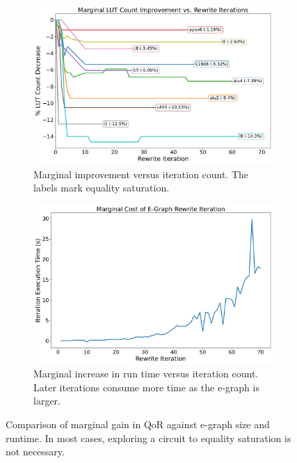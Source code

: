 \begin{figure}
    \begin{subfigure}{0.47\textwidth}
        \centering
        \includegraphics[width=\textwidth]{img/improvement.pdf}
        \caption{Marginal improvement versus iteration count. The labels mark equality saturation.}\label{fig:marginal:improvement}
    \end{subfigure}
    \hfill\vspace{4mm}
    \begin{subfigure}{0.47\textwidth}
        \centering
        \includegraphics[width=\textwidth]{img/runtime_derivative.pdf}
        \caption{Marginal increase in run time versus iteration count. Later iterations consume more time as the e-graph is larger.}\label{fig:marginal:runtime}
    \end{subfigure}
    \caption{Comparison of marginal gain in QoR against e-graph size and runtime. In most cases, exploring a circuit to equality saturation is not necessary.}\label{fig:marginal}
\end{figure}

